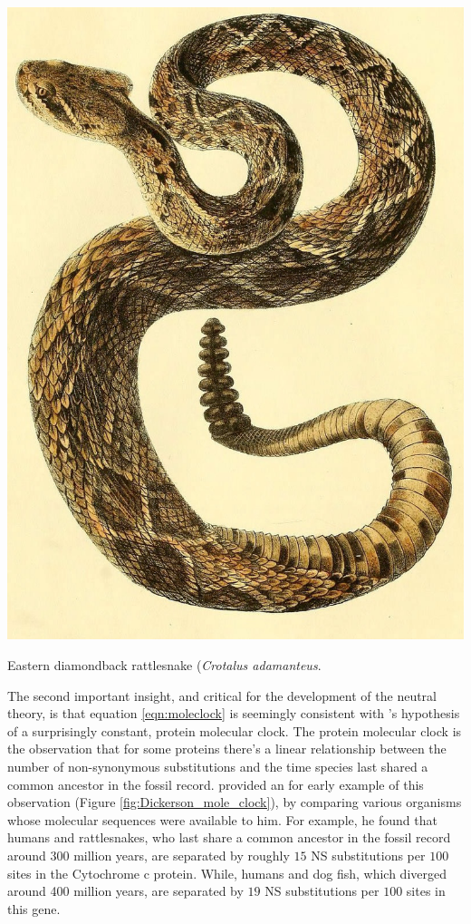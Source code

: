 \begin{marginfigure}[-1cm]
\begin{center}
\includegraphics[width= 0.8 \textwidth]{illustration_images/Genetic_drift/rattlesnake/rattlesnake.jpg}
\end{center}
\caption{Eastern diamondback rattlesnake ({\it Crotalus adamanteus}.  } \label{fig:rattlesnake}  
\end{marginfigure}

The second important insight, and critical for the development of the neutral theory, is that equation \eqref{eqn:moleclock} is seemingly consistent with \citet{zuckerkandl1965evolutionary}'s hypothesis of a surprisingly constant, protein molecular clock. The protein molecular clock is the observation that for some proteins there's a linear relationship between the number of non-synonymous substitutions and the time species last shared a common ancestor in the fossil record. \citet{dickerson1971structure} provided an for early example of this observation (Figure \ref{fig:Dickerson_mole_clock}), by comparing various organisms whose molecular sequences were available to him. For example, he found that humans and rattlesnakes, who last share a common ancestor in the fossil record around 300 million years, are separated by roughly $15$ NS substitutions per $100$ sites in the Cytochrome c protein.
While, humans and dog fish, which diverged around 400 million years, are separated by $19$ NS substitutions per $100$ sites in this gene. \\  

